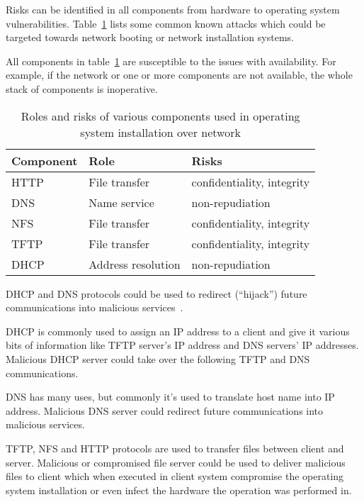 Risks can be identified in all components from hardware to operating
system vulnerabilities. Table~\ref{tab:risks_table} lists some
common known attacks which could be targeted towards network booting
or network installation systems.

All components in table~\ref{tab:risks_table} are susceptible to the
issues with availability. For example, if the network or one or more
components are not available, the whole stack of components is
inoperative.

\begin{table}[!ht]
  \def\arraystretch{1.1}%
  \begin{center}
    \begin{tabular}{| l | l | l |}
      \hline
      Component   & Role               & Risks                      \\
      \hline
      HTTP        & File transfer      & confidentiality, integrity \\
      DNS         & Name service       & non-repudiation            \\
      NFS         & File transfer      & confidentiality, integrity \\
      TFTP        & File transfer      & confidentiality, integrity \\
      DHCP        & Address resolution & non-repudiation            \\
      \hline
    \end{tabular}
    \caption{Roles and risks of various components used in operating
      system installation over network\label{tab:risks_table}}
  \end{center}
\end{table}


DHCP and DNS protocols could be used to redirect (``hijack'') future
communications into malicious
services~\cite{green2005dns}\cite{ornaghi2003man}.

DHCP is commonly used to assign an IP address to a client and give it
various bits of information like TFTP server's IP address and DNS
servers' IP addresses. Malicious DHCP server could take over the
following TFTP and DNS communications.

DNS has many uses, but commonly it's used to translate host name into
IP address. Malicious DNS server could redirect future communications
into malicious services.

TFTP, NFS and HTTP protocols are used to transfer files between client
and server. Malicious or compromised file server could be used to
deliver malicious files to client which when executed in client system
compromise the operating system installation or even infect the
hardware the operation was performed in.

